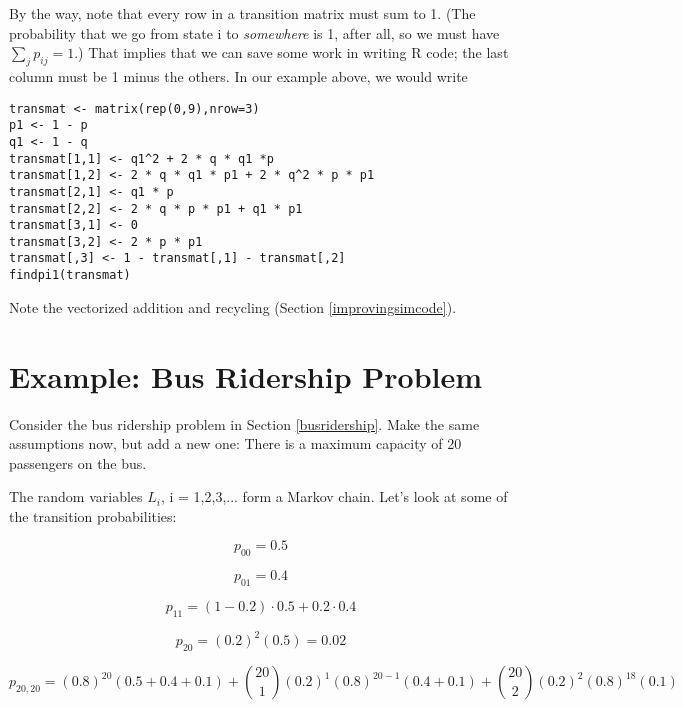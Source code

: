 By the way, note that every row in a transition matrix must sum to 1.
(The probability that we go from state i to {\it somewhere} is 1, after
all, so we must have $\sum_j p_{ij} = 1$.)  That implies that we can
save some work in writing R code; the last column must be 1 minus the
others.  In our example above, we would write

\begin{Verbatim}[fontsize=\relsize{-2}]
transmat <- matrix(rep(0,9),nrow=3)
p1 <- 1 - p
q1 <- 1 - q
transmat[1,1] <- q1^2 + 2 * q * q1 *p
transmat[1,2] <- 2 * q * q1 * p1 + 2 * q^2 * p * p1
transmat[2,1] <- q1 * p
transmat[2,2] <- 2 * q * p * p1 + q1 * p1
transmat[3,1] <- 0
transmat[3,2] <- 2 * p * p1
transmat[,3] <- 1 - transmat[,1] - transmat[,2]
findpi1(transmat)
\end{Verbatim}

Note the vectorized addition and recycling (Section
\ref{improvingsimcode}). 

\section{Example:  Bus Ridership Problem}

Consider the bus ridership problem in Section \ref{busridership}.  Make
the same assumptions now, but add a new one:  There is a maximum
capacity of 20 passengers on the bus.

The random variables $L_i$, i = 1,2,3,... form a Markov chain.  Let's
look at some of the transition probabilities:

\begin{equation}
p_{00} = 0.5 
\end{equation}

\begin{equation}
p_{01} = 0.4 
\end{equation}

\begin{equation}
p_{11} = (1-0.2) \cdot 0.5 + 0.2 \cdot 0.4
\end{equation}

\begin{equation}
p_{20} = (0.2)^2 (0.5) = 0.02
\end{equation}

\begin{equation}
p_{20,20} = (0.8)^{20} (0.5+0.4+0.1) + 
\binom{20}{1}
(0.2)^1 (0.8)^{20-1} (0.4 + 0.1) + 
\binom{20}{2}
(0.2)^2 (0.8)^{18} (0.1)
\end{equation}

